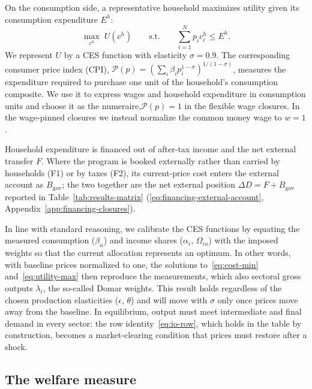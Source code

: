 On the consumption side, a representative household maximizes utility given its consumption expenditure $E^h$:
\begin{equation}
\max_{c^h} \; U(c^h)
\qquad \text{s.t.} \qquad \sum_{i=1}^N p_i c_i^h \leq E^h.
\label{eq:utility-max}
\end{equation}
We represent $U$ by a CES function with elasticity $\sigma = 0.9$.
The corresponding consumer price index (CPI), $\mathcal{P}(p) = (\sum_i \beta_i p_i^{1-\sigma})^{1/(1-\sigma)}$, measures the expenditure required to purchase one unit of the household's consumption composite. We use it to express wages and household expenditure in consumption units and choose it as the numeraire,$\mathcal{P}(p)=1$ in the flexible wage closures.  In the wage-pinned closures we instead normalize the common money wage to $w=1$.

Household expenditure is financed out of after-tax income and the net external transfer $F$.
Where the program is booked externally rather than carried by households (F1) or by taxes (F2),
its current-price cost enters the external account as $B_{\mathrm{gov}}$; the two together are
the net external position $\Delta D = F + B_{\mathrm{gov}}$ reported in Table~\ref{tab:results-matrix}
(\eqref{eq:financing-external-account}, Appendix~\ref{app:financing-closures}).

In line with standard reasoning, we calibrate the CES functions by equating the measured consumption ($\beta_u$) and income shares ($\alpha_i$, $\Omega_{iu}$) with the imposed weights so that the current allocation represents an optimum. In other words, with baseline prices normalized to one, the solutions to~\eqref{eq:cost-min} and~\eqref{eq:utility-max} then reproduce the measurements, which also sectoral gross outputs $\lambda_i$, the so-called Domar weights. This result holds regardless of the chosen production elasticities ($\epsilon$, $\theta$) and will move with $\sigma$ only once prices move away from the baseline. In equilibrium, output must meet intermediate and final demand in every sector: the row identity~\eqref{eq:io-row}, which holds in the table by construction, becomes a market-clearing condition that prices must restore after a shock.

\subsection{The welfare measure}\label{subsec:welfare}

